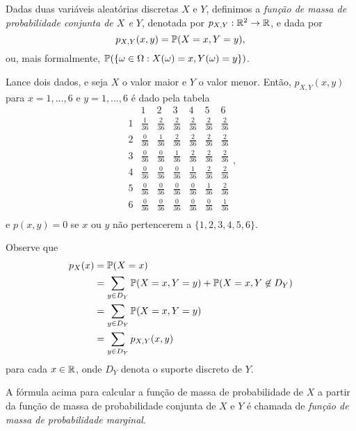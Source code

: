 \begin{definition}
Dadas duas variáveis aleatórias discretas $ X $ e $ Y $, definimos a \emph{função de massa de probabilidade conjunta de $ X $ e $ Y $}, denotada por $ p_{X,Y}:\mathbb{R}^2 \to \mathbb{R} $, e dada por
\[
p_{X,Y}(x,y)=\mathbb{P}(X=x, Y=y),
\]
ou, mais formalmente, $ \mathbb{P}(\{\omega\in\Omega: X(\omega)=x, Y(\omega)=y\}) $.
\end{definition}

\begin{example}
Lance dois dados, e seja $ X $ o valor maior e $ Y $ o valor menor.
Então, $ p_{X,Y}(x,y) $ para $ x=1,\dots,6 $ e $ y=1,\dots,6 $ é dado pela tabela
\[
\begin{array}{r|rrrrrr}
  & 1 & 2 & 3 & 4 & 5 & 6 \\
\hline
1 & \frac{1}{36} & \frac{2}{36} & \frac{2}{36} & \frac{2}{36} & \frac{2}{36} & \frac{2}{36} \\
2 & \frac{0}{36} & \frac{1}{36} & \frac{2}{36} & \frac{2}{36} & \frac{2}{36} & \frac{2}{36} \\
3 & \frac{0}{36} & \frac{0}{36} & \frac{1}{36} & \frac{2}{36} & \frac{2}{36} & \frac{2}{36} \\
4 & \frac{0}{36} & \frac{0}{36} & \frac{0}{36} & \frac{1}{36} & \frac{2}{36} & \frac{2}{36} \\
5 & \frac{0}{36} & \frac{0}{36} & \frac{0}{36} & \frac{0}{36} & \frac{1}{36} & \frac{2}{36} \\
6 & \frac{0}{36} & \frac{0}{36} & \frac{0}{36} & \frac{0}{36} & \frac{0}{36} & \frac{1}{36} \\
\end{array}
,
\]
e $ p(x,y)=0 $ se $ x $ ou $ y $ não pertencerem a $ \{1,2,3,4,5,6\} $.
\end{example}

Observe que
\begin{align}
p_X(x)
&=
\mathbb{P}(X=x)
\\
&
=
\sum_{y\in D_Y} \mathbb{P}(X=x,Y=y)
+
\mathbb{P}(X=x,Y\not\in D_Y)
\\
&
=
\sum_{y\in D_Y} \mathbb{P}(X=x,Y=y)
\\
&
=
\sum_{y \in D_Y} p_{X,Y}(x,y)
\end{align}
para cada $ x \in \mathbb{R} $, onde $ D_Y $ denota o suporte discreto de $ Y $.

\begin{terminology*}
A fórmula acima para calcular a função de massa de probabilidade de $ X $ a partir da função de massa de probabilidade conjunta de $ X $ e $ Y $ é chamada de \emph{função de massa de probabilidade marginal}.
\end{terminology*}

